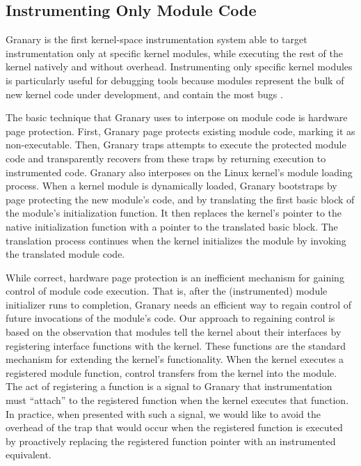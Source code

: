 \documentclass[preprint]{sigplanconf}
\begin{document}
\subsection{Instrumenting Only Module Code}\label{sec:module}

Granary is the first kernel-space instrumentation system able to target instrumentation only at specific kernel modules, while executing the rest of the kernel natively and without overhead. Instrumenting only specific kernel modules is particularly useful for debugging tools because modules represent the bulk of new kernel code under development, and contain the most bugs \cite{FaultsInLinux}.

The basic technique that Granary uses to interpose on module code is hardware page protection. First, Granary page protects existing module code, marking it as non-executable. Then, Granary traps attempts to execute the protected module code and transparently recovers from these traps by returning execution to instrumented code. Granary also interposes on the Linux kernel's module loading process. When a kernel module is dynamically loaded, Granary bootstraps by page protecting the new module's code, and by translating the first basic block of the module's initialization function.  It then replaces the kernel's pointer to the native initialization function with a pointer to the translated basic block. The translation process continues when the kernel initializes the module by invoking the translated module code. 



While correct, hardware page protection is an inefficient mechanism for gaining control of module code execution. That is, after the (instrumented) module initializer runs to completion, Granary needs an efficient way to regain control of future invocations of the module's code. Our approach to regaining control is based on the observation that modules tell the kernel about their interfaces by registering interface functions with the kernel. These functions are the standard mechanism for extending the kernel's functionality. When the kernel executes a registered module function, control transfers from the kernel into the module. The act of registering a function is a signal to Granary that instrumentation must ``attach'' to the registered function when the kernel executes that function. In practice, when presented with such a signal, we would like to avoid the overhead of the trap that would occur when the registered function is executed by proactively replacing the registered function pointer with an instrumented equivalent.
\end{document}
